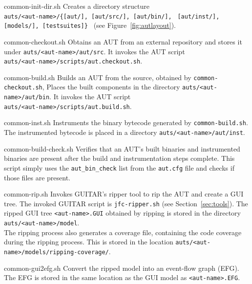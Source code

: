 \begin{smalldescription}
\label{sec:commondescription}

   \item [common-init-dir.sh] Creates a directory structure\\ \texttt{auts/<aut-name>/\{[aut/], [aut/src/], [aut/bin/], } \texttt{[aut/inst/], [models/], [testsuites]\} } (see Figure~\ref{fig:autlayout}).

   \item [common-checkout.sh] Obtains an AUT from an external repository and stores it under \texttt{auts/<aut-name>/aut/src}. It invokes the AUT script \\ \texttt{auts/<aut-name>/scripts/aut.checkout.sh}.

   \item [common-build.sh] Builds an AUT from the source, obtained by \texttt{common-checkout.sh}, Places the built components in the directory \texttt{auts/<aut-name>/aut/bin}. It invokes the AUT script \\ \texttt{auts/<aut-name>/scripts/aut.build.sh}.

   \item [common-inst.sh] Instruments the binary bytecode generated by \texttt{common-build.sh}. The instrumented bytecode is placed in a directory \texttt{auts/<aut-name>/aut/inst}.

  \item [common-build-check.sh] Verifies that an AUT's built binaries and instrumented binaries are present after the build and instrumentation steps complete. This script simply uses the \texttt{aut\_bin\_check} list from the \texttt{aut.cfg} file and checks if those files are present.

   \item [common-rip.sh] Invokes GUITAR's ripper tool to rip the AUT and create a GUI tree. The invoked GUITAR script is \texttt{jfc-ripper.sh} (see Section~\ref{sec:tools}). The ripped GUI tree \texttt{<aut-name>.GUI} obtained by ripping is stored in the directory \\ \texttt{auts/<aut-name>/model}. \\
   The ripping process also generates a coverage file, containing the code coverage during the ripping process. This is stored in the location \texttt{auts/<aut-name>/models/ripping-coverage/}.

   \item [common-gui2efg.sh] Convert the ripped model into an event-flow graph (EFG). The EFG is stored in the same location as the GUI model as \texttt{<aut-name>.EFG}.


\end{smalldescription}
